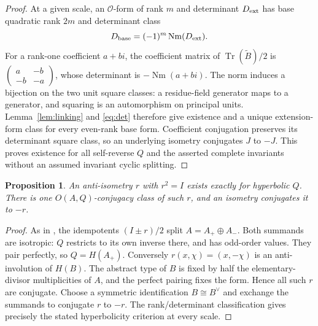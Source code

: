 \documentclass{amsart}
\newtheorem{proposition}[theorem]{Proposition}
\theoremstyle{definition}\newtheorem{definition}[theorem]{Definition}
\theoremstyle{remark}\newtheorem{remark}[theorem]{Remark}
\newcommand{\Tr}{\operatorname{Tr}}\newcommand{\Nm}{\operatorname{Nm}}
\begin{document}
\begin{proof}
At a given scale, an $\mathcal O$-form of rank $m$ and determinant
$D_{\rm ext}$ has base quadratic rank $2m$ and determinant class
\begin{equation}\label{eq:det}
                 D_{\rm base}=(-1)^m\Nm(D_{\rm ext}).
\end{equation}
For a rank-one coefficient $a+bi$, the coefficient matrix of
$\Tr(\widetilde B)/2$ is
$\left(\begin{smallmatrix}a&-b\\-b&-a\end{smallmatrix}\right)$,
whose determinant is $-\Nm(a+bi)$. The norm induces a bijection
on the two unit square classes: a residue-field generator maps
to a generator, and squaring is an automorphism on principal units.
Lemma~\ref{lem:linking} and \eqref{eq:det} therefore give existence
and a unique extension-form class for every even-rank base form.
Coefficient conjugation preserves its determinant square class,
so an underlying isometry conjugates $J$ to $-J$.
This proves existence for all self-reverse $Q$ and the asserted
complete invariants without an assumed invariant cyclic splitting.
\end{proof}

\begin{proposition}\label{prop:involution}
An anti-isometry $r$ with $r^2=I$ exists exactly for hyperbolic $Q$.
There is one $O(A,Q)$-conjugacy class of such $r$, and an isometry
conjugates it to $-r$.
\end{proposition}
\begin{proof}
As in \cite[Section 4]{LT}, the idempotents $(I\pm r)/2$
split $A=A_+\oplus A_-$.
Both summands are isotropic: $Q$ restricts to its own inverse there,
and has odd-order values. They pair perfectly, so $Q=H(A_+)$.
Conversely $r(x,\chi)=(x,-\chi)$ is an anti-involution of $H(B)$.
The abstract type of $B$ is fixed by half the elementary-divisor
multiplicities of $A$, and the perfect pairing fixes the form.
Hence all such $r$ are conjugate. Choose a symmetric identification
$B\cong B^\vee$ and exchange the summands to conjugate $r$ to $-r$.
The rank/determinant classification gives precisely the stated
hyperbolicity criterion at every scale.
\end{proof}
\end{document}
